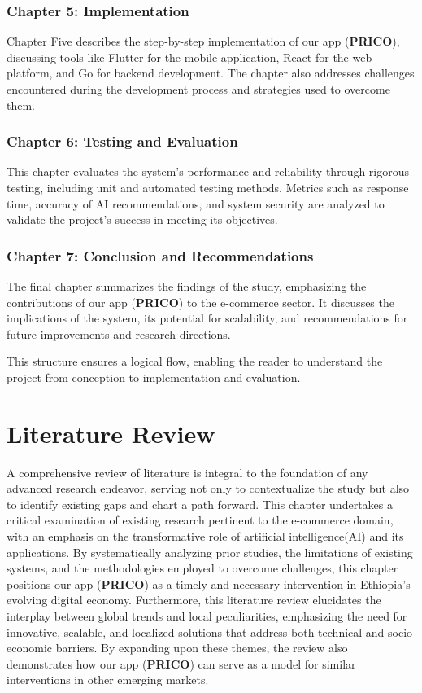 \documentclass[12pt]{report}
\begin{document}
\subsection*{Chapter 5: Implementation}

Chapter Five describes the step-by-step implementation of our app (\textbf{PRICO}), discussing
tools like Flutter for the mobile application, React for the web platform, and Go for backend
development. The chapter also addresses challenges encountered during the development
process and strategies used to overcome them.

\subsection*{Chapter 6: Testing and Evaluation}

This chapter evaluates the system’s performance and reliability through rigorous testing,
including unit and automated testing methods. Metrics such as response time, accuracy of AI
recommendations, and system security are analyzed to validate the project’s success in
meeting its objectives.

\subsection*{Chapter 7: Conclusion and Recommendations}

The final chapter summarizes the findings of the study, emphasizing the contributions of our
app (\textbf{PRICO}) to the e-commerce sector. It discusses the implications of the system, its
potential for scalability, and recommendations for future improvements and research
directions.

This structure ensures a logical flow, enabling the reader to understand the project from
conception to implementation and evaluation.

\chapter{Literature Review}

A comprehensive review of literature is integral to the foundation of any advanced research
endeavor, serving not only to contextualize the study but also to identify existing gaps and
chart a path forward. This chapter undertakes a critical examination of existing research
pertinent to the e-commerce domain, with an emphasis on the transformative role of artificial
intelligence(AI) and its applications. By systematically analyzing prior studies, the limitations
of existing systems, and the methodologies employed to overcome challenges, this chapter
positions our app (\textbf{PRICO}) as a timely and necessary intervention in Ethiopia’s evolving
digital economy. Furthermore, this literature review elucidates the interplay between global
trends and local peculiarities, emphasizing the need for innovative, scalable, and localized
solutions that address both technical and socio-economic barriers. By expanding upon these
themes, the review also demonstrates how our app (\textbf{PRICO}) can serve as a model for similar
interventions in other emerging markets.
\end{document}
